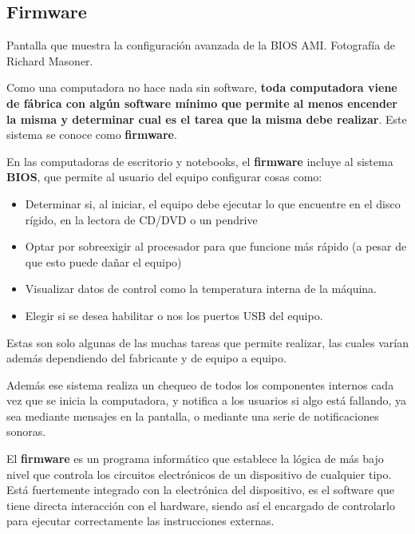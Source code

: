 \subsection{Firmware}

{Pantalla que muestra la configuración avanzada de la BIOS AMI.}
{Fotografía de Richard Masoner.}

Como una computadora no hace nada sin software, \textbf{toda computadora viene
de fábrica con algún software mínimo que permite al menos encender la
misma y determinar cual es el tarea que la misma debe realizar}.
Este sistema se conoce como \textbf{firmware}.\autocite[vid.]{mw_firmware_2018}

En las computadoras de escritorio y notebooks, el \textbf{firmware} incluye al
sistema \textbf{BIOS}, que permite al usuario del equipo configurar cosas como:
\begin{itemize}
    \item Determinar si, al iniciar, el equipo debe ejecutar lo que encuentre en
        el disco rígido, en la lectora de CD/DVD o un pendrive
    \item Optar por sobreexigir al procesador para que funcione más rápido
        (a pesar de que esto puede dañar el equipo)
    \item Visualizar datos de control como la temperatura interna de la máquina.
    \item Elegir si se desea habilitar o nos los puertos USB del equipo.
\end{itemize}
Estas son solo algunas de las muchas tareas que permite realizar, las cuales
varían además dependiendo del fabricante y de equipo a equipo.

Además ese sistema realiza un chequeo de todos los componentes internos cada
vez que se inicia la computadora, y notifica a los usuarios si algo está fallando,
ya sea mediante mensajes en la pantalla, o mediante una serie de notificaciones
sonoras.

\begin{definition}
    El \textbf{firmware} es un programa informático que establece la lógica de
    más bajo nivel que controla los circuitos electrónicos de un dispositivo de
    cualquier tipo. Está fuertemente integrado con la electrónica del
    dispositivo, es el software que tiene directa interacción con el hardware,
    siendo así el encargado de controlarlo para ejecutar correctamente las
    instrucciones externas.\autocite[vid. p. 185]{laplante_2000}
    \autocite[p. 192]{downing_2009}
\end{definition}

